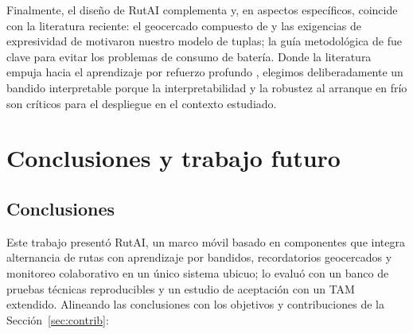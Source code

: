\documentclass[a4paper,fleqn]{cas-sc}
\newcommand{\RUTAI}{RutAI\xspace}
\newcommand{\TAM}{TAM\xspace}
\begin{document}
	Finalmente, el dise\~no de \RUTAI complementa y, en aspectos espec\'ificos, coincide con la literatura reciente: el geocercado compuesto de \citet{garzon2014geofencing} y las exigencias de expresividad de \citet{wang2015beyond} motivaron nuestro modelo de tuplas; la gu\'ia metodol\'ogica de \citet{shevchenko2024geofencing} fue clave para evitar los problemas de consumo de bater\'ia. Donde la literatura empuja hacia el aprendizaje por refuerzo profundo \citep{zhang2025drlnavigation}, elegimos deliberadamente un bandido interpretable porque la interpretabilidad y la robustez al arranque en fr\'io son cr\'iticos para el despliegue en el contexto estudiado.
	
	\section{Conclusiones y trabajo futuro}\label{sec:conclusion}
	
	\subsection{Conclusiones}\label{sec:conclusions}
	
	Este trabajo present\'o \RUTAI, un marco m\'ovil basado en componentes que integra alternancia de rutas con aprendizaje por bandidos, recordatorios geocercados y monitoreo colaborativo en un \'unico sistema ubicuo; lo evalu\'o con un banco de pruebas t\'ecnicas reproducibles y un estudio de aceptaci\'on con un \TAM extendido. Alineando las conclusiones con los objetivos y contribuciones de la Secci\'on~\ref{sec:contrib}:
	
\end{document}
